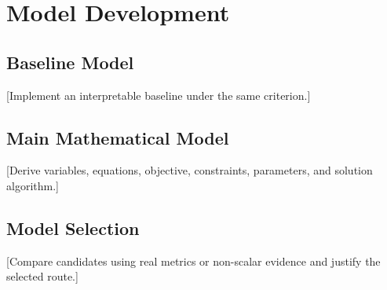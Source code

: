 \section{Model Development}
\subsection{Baseline Model}
[Implement an interpretable baseline under the same criterion.]
\subsection{Main Mathematical Model}
[Derive variables, equations, objective, constraints, parameters, and solution algorithm.]
\subsection{Model Selection}
[Compare candidates using real metrics or non-scalar evidence and justify the selected route.]
